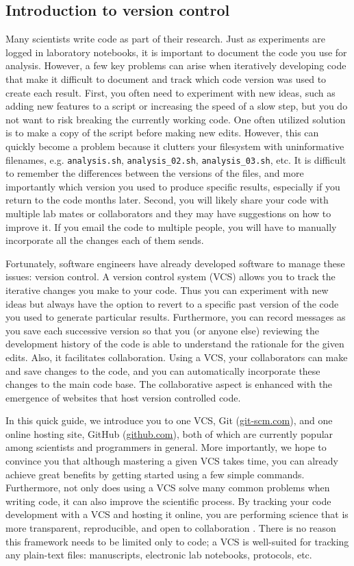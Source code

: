 \subsection{Introduction to version control}

Many scientists write code as part of their research.
Just as experiments are logged in laboratory notebooks, it is important to document the code you use for analysis.
However, a few key problems can arise when iteratively developing code that make it difficult to document and track which code version was used to create each result.
First, you often need to experiment with new ideas, such as adding new features to a script or increasing the speed of a slow step, but you do not want to risk breaking the currently working code.
One often utilized solution is to make a copy of the script before making new edits.
However, this can quickly become a problem because it clutters your filesystem with uninformative filenames, e.g. \verb|analysis.sh|, \verb|analysis_02.sh|, \verb|analysis_03.sh|, etc.
It is difficult to remember the differences between the versions of the files, and more importantly which version you used to produce specific results, especially if you return to the code months later.
Second, you will likely share your code with multiple lab mates or collaborators and they may have suggestions on how to improve it.
If you email the code to multiple people, you will have to manually incorporate all the changes each of them sends.

Fortunately, software engineers have already developed software to manage these issues: version control. 
A version control system (VCS) allows you to track the iterative changes you make to your code.
Thus you can experiment with new ideas but always have the option to revert to a specific past version of the code you used to generate particular results.
Furthermore, you can record messages as you save each successive version so that you (or anyone else) reviewing the development history of the code is able to understand the rationale for the given edits.
Also, it facilitates collaboration.
Using a VCS, your collaborators can make and save changes to the code, and you can automatically incorporate these changes to the main code base.
The collaborative aspect is enhanced with the emergence of websites that host version controlled code.

In this quick guide, we introduce you to one VCS, Git (\href{http://git-scm.com/}{git-scm.com}), and one online hosting site, GitHub (\href{https://github.com}{github.com}), both of which are currently popular among scientists and programmers in general.
More importantly, we hope to convince you that although mastering a given VCS takes time, you can already achieve great benefits by getting started using a few simple commands.
Furthermore, not only does using a VCS solve many common problems when writing code, it can also improve the scientific process.
By tracking your code development with a VCS and hosting it online, you are performing science that is more transparent, reproducible, and open to collaboration \cite{23448176, 24415924}.
There is no reason this framework needs to be limited only to code; a VCS is well-suited for tracking any plain-text files: manuscripts, electronic lab notebooks, protocols, etc.
  